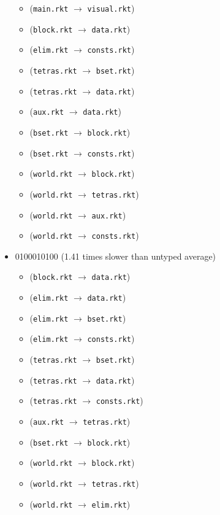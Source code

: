 \documentclass{article}
\newcommand{\mono}[1]{\texttt{#1}}
\begin{document}
\begin{itemize}
\begin{itemize}
  \item (\mono{main.rkt} $\rightarrow$ \mono{visual.rkt})
  \item (\mono{block.rkt} $\rightarrow$ \mono{data.rkt})
  \item (\mono{elim.rkt} $\rightarrow$ \mono{consts.rkt})
  \item (\mono{tetras.rkt} $\rightarrow$ \mono{bset.rkt})
  \item (\mono{tetras.rkt} $\rightarrow$ \mono{data.rkt})
  \item (\mono{aux.rkt} $\rightarrow$ \mono{data.rkt})
  \item (\mono{bset.rkt} $\rightarrow$ \mono{block.rkt})
  \item (\mono{bset.rkt} $\rightarrow$ \mono{consts.rkt})
  \item (\mono{world.rkt} $\rightarrow$ \mono{block.rkt})
  \item (\mono{world.rkt} $\rightarrow$ \mono{tetras.rkt})
  \item (\mono{world.rkt} $\rightarrow$ \mono{aux.rkt})
  \item (\mono{world.rkt} $\rightarrow$ \mono{consts.rkt})
  \end{itemize}
\item 0100010100 (1.41 times slower than untyped average)
  \begin{itemize}
  \item (\mono{block.rkt} $\rightarrow$ \mono{data.rkt})
  \item (\mono{elim.rkt} $\rightarrow$ \mono{data.rkt})
  \item (\mono{elim.rkt} $\rightarrow$ \mono{bset.rkt})
  \item (\mono{elim.rkt} $\rightarrow$ \mono{consts.rkt})
  \item (\mono{tetras.rkt} $\rightarrow$ \mono{bset.rkt})
  \item (\mono{tetras.rkt} $\rightarrow$ \mono{data.rkt})
  \item (\mono{tetras.rkt} $\rightarrow$ \mono{consts.rkt})
  \item (\mono{aux.rkt} $\rightarrow$ \mono{tetras.rkt})
  \item (\mono{bset.rkt} $\rightarrow$ \mono{block.rkt})
  \item (\mono{world.rkt} $\rightarrow$ \mono{block.rkt})
  \item (\mono{world.rkt} $\rightarrow$ \mono{tetras.rkt})
  \item (\mono{world.rkt} $\rightarrow$ \mono{elim.rkt})
  \end{itemize}

\end{itemize}
\end{document}
